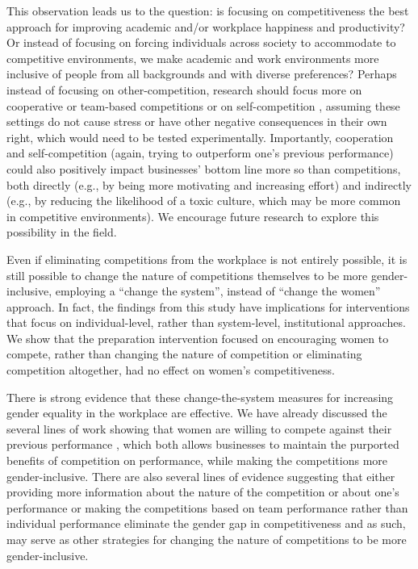 \documentclass[a4paper, nobind]{templates/ociamthesis}
\begin{document}
This observation leads us to the question: is focusing on competitiveness the best approach for improving academic and/or workplace happiness and productivity? Or instead of focusing on forcing individuals across society to accommodate to competitive environments, we make academic and work environments more inclusive of people from all backgrounds and with diverse preferences? Perhaps instead of focusing on other-competition, research should focus more on cooperative or team-based competitions \autocite{Gagliarducci2022,Kuhn2015} or on self-competition \autocite{Bonte2018,Carpenter2018,Klinowski2019,Apicella2017a,Apicella2020}, assuming these settings do not cause stress or have other negative consequences in their own right, which would need to be tested experimentally. Importantly, cooperation and self-competition (again, trying to outperform one's previous performance) could also positively impact businesses' bottom line more so than competitions, both directly (e.g., by being more motivating and increasing effort) and indirectly (e.g., by reducing the likelihood of a toxic culture, which may be more common in competitive environments). We encourage future research to explore this possibility in the field.

Even if eliminating competitions from the workplace is not entirely possible, it is still possible to change the nature of competitions themselves to be more gender-inclusive, employing a ``change the system'', instead of ``change the women'' approach. In fact, the findings from this study have implications for interventions that focus on individual-level, rather than system-level, institutional approaches. We show that the preparation intervention focused on encouraging women to compete, rather than changing the nature of competition or eliminating competition altogether, had no effect on women's competitiveness.

There is strong evidence that these change-the-system measures for increasing gender equality in the workplace are effective. We have already discussed the several lines of work showing that women are willing to compete against their previous performance \autocite{Bonte2018,Carpenter2018,Klinowski2019,Apicella2017a,Apicella2020}, which both allows businesses to maintain the purported benefits of competition on performance, while making the competitions more gender-inclusive. There are also several lines of evidence suggesting that either providing more information about the nature of the competition or about one's performance \autocite{Brandts2015,Balafoutas2019,Coffman2021b,Wozniak2014} or making the competitions based on team performance rather than individual performance \autocite{Healy2011,Dargnies2012,Kuhn2015} eliminate the gender gap in competitiveness and as such, may serve as other strategies for changing the nature of competitions to be more gender-inclusive.
\end{document}
